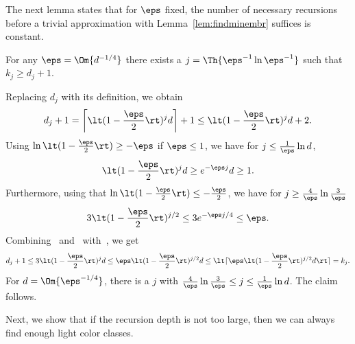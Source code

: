 The next lemma states that for $\eps$ fixed, the number of necessary 
recursions before a trivial approximation with 
Lemma~\ref{lem:findminembr} suffices is constant.

\begin{lemma}\label{lem:recdepth}
  For any $\eps = \Om{d^{-1/4}}$ there exists a 
  $j = \Th{ \eps^{-1} \ln \eps^{-1}}$ such that $k_j \geq d_j+1$.
\end{lemma}
\begin{prf}
Replacing $d_j$ with its definition, we obtain
\begin{equation}\label{lem:recdepth:dj}
  d_j + 1 = \left\lceil \lt(1-\frac{\eps}{2}\rt)^j d \right\rceil + 1
  \leq \lt(1-\frac{\eps}{2}\rt)^j d + 2.
\end{equation}
Using $\ln\lt(1- \frac{\eps}{2}\rt) \geq  -\eps$ if $\eps\leq 1$, we 
have for
$j \leq \frac{1}{\eps} \ln d$,
\begin{equation}\label{lem:recdepth:geq1}
\lt(1-\frac{\eps}{2}\rt)^j d \geq e^{-\eps j}d \geq 1.
\end{equation}
Furthermore, using that $\ln\lt(1-\frac{\eps}{2}\rt) \leq
-\frac{\eps}{2}$, we have for $j \geq \frac{4}{\eps} \ln \frac{3}{\eps}$
\begin{equation}\label{lem:recdepth:eps}
  3 \lt(1 - \frac{\eps}{2}\rt)^{j/2} \leq 
  3 e^{-\eps j/4} \leq \eps.
\end{equation}
Combining~ and~
with~, we get
\[
  d_j + 1
  \leq 3 \lt(1 - \frac{\eps}{2}\rt)^j d
  \leq \eps \lt(1 - \frac{\eps}{2}\rt)^{j/2} d
  \leq \lt\lceil\eps \lt(1 - \frac{\eps}{2}\rt)^{j/2} d\rt\rceil
  = k_j.
\]
For $d = \Om{\eps^{-1/4}}$, there is a $j$ with
$\frac{4}{\eps}\ln \frac{3}{\eps} \leq j \leq \frac{1}{\eps} \ln d$. 
The claim follows.
\end{prf}

Next, we show that if the recursion depth is not too large, then we can
always find enough light color classes.

